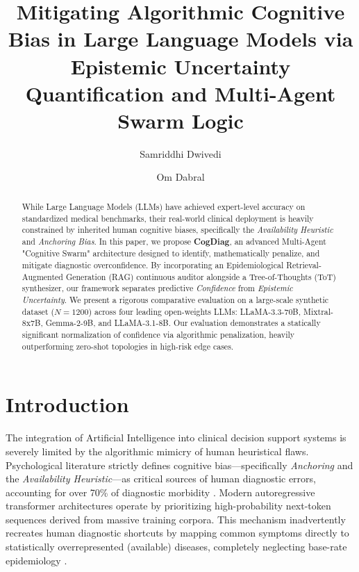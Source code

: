 \documentclass{svproc}
\begin{document}
\mainmatter

\title{Mitigating Algorithmic Cognitive Bias in Large Language Models via Epistemic Uncertainty Quantification and Multi-Agent Swarm Logic}


\author{Samriddhi Dwivedi \and Om Dabral}



\maketitle

\begin{abstract}
While Large Language Models (LLMs) have achieved expert-level accuracy on standardized medical benchmarks, their real-world clinical deployment is heavily constrained by inherited human cognitive biases, specifically the \textit{Availability Heuristic} and \textit{Anchoring Bias}. In this paper, we propose \textbf{CogDiag}, an advanced Multi-Agent "Cognitive Swarm" architecture designed to identify, mathematically penalize, and mitigate diagnostic overconfidence. By incorporating an Epidemiological Retrieval-Augmented Generation (RAG) continuous auditor alongside a Tree-of-Thoughts (ToT) synthesizer, our framework separates predictive \textit{Confidence} from \textit{Epistemic Uncertainty}. We present a rigorous comparative evaluation on a large-scale synthetic dataset ($N=1200$) across four leading open-weights LLMs: LLaMA-3.3-70B, Mixtral-8x7B, Gemma-2-9B, and LLaMA-3.1-8B. Our evaluation demonstrates a statically significant normalization of confidence via algorithmic penalization, heavily outperforming zero-shot topologies in high-risk edge cases.
\end{abstract}

\section{Introduction}\label{sec:intro}
The integration of Artificial Intelligence into clinical decision support systems is severely limited by the algorithmic mimicry of human heuristical flaws. Psychological literature strictly defines cognitive bias—specifically \textit{Anchoring} and the \textit{Availability Heuristic}—as critical sources of human diagnostic errors, accounting for over 70\% of diagnostic morbidity \cite{kahneman1974judgment, croskerry2013mindless}. Modern autoregressive transformer architectures operate by prioritizing high-probability next-token sequences derived from massive training corpora. This mechanism inadvertently recreates human diagnostic shortcuts by mapping common symptoms directly to statistically overrepresented (available) diseases, completely neglecting base-rate epidemiology \cite{nori2023capabilities}.
\end{document}
